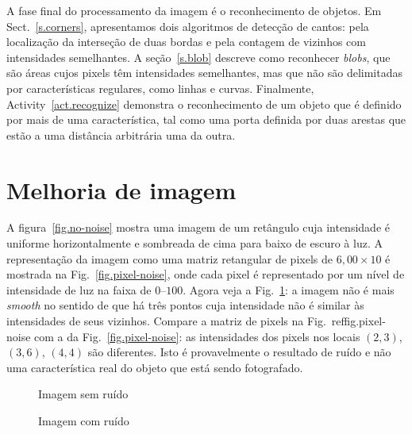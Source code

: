 A fase final do processamento da imagem é o reconhecimento de objetos. Em Sect.~\ref{s.corners}, apresentamos dois algoritmos de detecção de cantos: pela localização da interseção de duas bordas e pela contagem de vizinhos com intensidades semelhantes. A seção~\ref{s.blob} descreve como reconhecer \emph{blobs}, que são áreas cujos pixels têm intensidades semelhantes, mas que não são delimitadas por características regulares, como linhas e curvas. Finalmente, Activity~\ref{act.recognize} demonstra o reconhecimento de um objeto que é definido por mais de uma característica, tal como uma porta definida por duas arestas que estão a uma distância arbitrária uma da outra.

\section{Melhoria de imagem}\label{s.enhance}

A figura~\ref{fig.no-noise} mostra uma imagem de um retângulo cuja intensidade é uniforme horizontalmente e sombreada de cima para baixo de escuro à luz. A representação da imagem como uma matriz retangular de pixels de $6,00\times 10$ é mostrada na Fig.~\ref{fig.pixel-noise}, onde cada pixel é representado por um nível de intensidade de luz na faixa de $0$--$100$. Agora veja a Fig.~\ref{fig.noise}: a imagem não é mais \emph{smooth} no sentido de que há três pontos cuja intensidade não é similar às intensidades de seus vizinhos. Compare a matriz de pixels na Fig.~ref{fig.pixel-noise} com a da Fig.~\ref{fig.pixel-noise}: as intensidades dos pixels nos locais $(2,3)$, $(3,6)$, $(4,4)$ são diferentes. Isto é provavelmente o resultado de ruído e não uma característica real do objeto que está sendo fotografado. 

\begin{figure}
\begin{minipage}{.45\textwidth}
\caption{Imagem sem ruído}\label{fig.no-noise}
\end{minipage}
\hspace{\fill}
\begin{minipage}{.45\textwidth}
\caption{Imagem com ruído}\label{fig.noise}
\end{minipage}
\end{figure}

